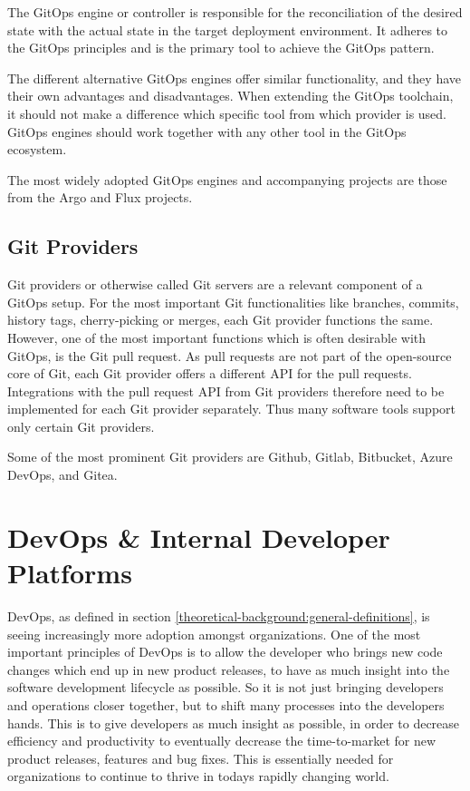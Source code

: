 The GitOps engine or controller is responsible for the
reconciliation of the desired state with the actual state
in the target deployment environment.
It adheres to the GitOps principles and is the primary tool
to achieve the GitOps pattern.

The different alternative GitOps engines offer similar functionality,
and they have their own advantages and disadvantages.
When extending the GitOps toolchain, it should not make a difference which specific
tool from which provider is used.
GitOps engines should work together with any other tool in the GitOps ecosystem.

The most widely adopted GitOps engines and accompanying projects are those from
the Argo
\autocite{argoProjWebsite}
and Flux
\autocite{fluxWebsite}
projects.








\subsection*{Git Providers}

Git providers or otherwise called Git servers are a relevant component of
a GitOps setup.
For the most important Git functionalities like branches, commits, history
tags, cherry-picking or merges, each Git provider functions the same.
However, one of the most important functions which is often desirable with GitOps, is the Git pull request.
As pull requests are not part of the open-source core of Git,
each Git provider offers a different API for the pull requests.
Integrations with the pull request API from Git providers therefore need to be implemented
for each Git provider separately. Thus many software tools support only certain Git providers.

Some of the most prominent Git providers are
Github,
Gitlab,
Bitbucket,
Azure DevOps, and
Gitea.










\section{DevOps \& Internal Developer Platforms}

DevOps, as defined in section \ref{theoretical-background:general-definitions},
is seeing increasingly more adoption amongst organizations.
One of the most important principles of DevOps is
to allow the developer who brings new code changes
which end up in new product releases,
to have as much insight into the software development lifecycle as possible.
So it is not just bringing developers and operations closer together,
but to shift many processes into the developers hands.
This is to give developers as much insight as possible,
in order to decrease efficiency and productivity to eventually
decrease the time-to-market for new product releases, features and bug fixes.
This is essentially needed for organizations to continue to thrive in todays
rapidly changing world.

